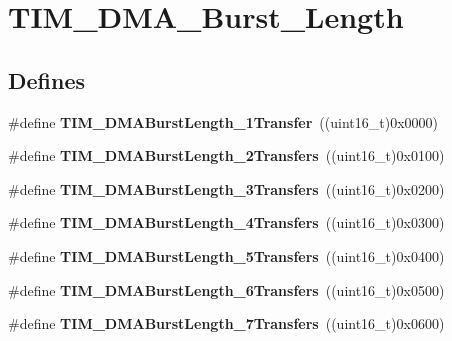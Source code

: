 \hypertarget{group__TIM__DMA__Burst__Length}{
\section{TIM\_\-DMA\_\-Burst\_\-Length}
\label{group__TIM__DMA__Burst__Length}
}
\subsection*{Defines}
\begin{DoxyCompactItemize}
\item 
\hypertarget{group__TIM__DMA__Burst__Length_gab87f91f1c5583b9888cb6bb37fc639e2}{
\#define {\bfseries TIM\_\-DMABurstLength\_\-1Transfer}~((uint16\_\-t)0x0000)}
\label{group__TIM__DMA__Burst__Length_gab87f91f1c5583b9888cb6bb37fc639e2}

\item 
\hypertarget{group__TIM__DMA__Burst__Length_ga829504c3e8c90a9445f6a223bc3034f8}{
\#define {\bfseries TIM\_\-DMABurstLength\_\-2Transfers}~((uint16\_\-t)0x0100)}
\label{group__TIM__DMA__Burst__Length_ga829504c3e8c90a9445f6a223bc3034f8}

\item 
\hypertarget{group__TIM__DMA__Burst__Length_ga3a99863a0925e0cc9a11b91aade66f11}{
\#define {\bfseries TIM\_\-DMABurstLength\_\-3Transfers}~((uint16\_\-t)0x0200)}
\label{group__TIM__DMA__Burst__Length_ga3a99863a0925e0cc9a11b91aade66f11}

\item 
\hypertarget{group__TIM__DMA__Burst__Length_ga84bfeb309593a1ac580e233bf7514b36}{
\#define {\bfseries TIM\_\-DMABurstLength\_\-4Transfers}~((uint16\_\-t)0x0300)}
\label{group__TIM__DMA__Burst__Length_ga84bfeb309593a1ac580e233bf7514b36}

\item 
\hypertarget{group__TIM__DMA__Burst__Length_ga44f8aa51fbe8887a5f3c37a0e776902c}{
\#define {\bfseries TIM\_\-DMABurstLength\_\-5Transfers}~((uint16\_\-t)0x0400)}
\label{group__TIM__DMA__Burst__Length_ga44f8aa51fbe8887a5f3c37a0e776902c}

\item 
\hypertarget{group__TIM__DMA__Burst__Length_ga8be40a21654eea72e9c1bf9922675b22}{
\#define {\bfseries TIM\_\-DMABurstLength\_\-6Transfers}~((uint16\_\-t)0x0500)}
\label{group__TIM__DMA__Burst__Length_ga8be40a21654eea72e9c1bf9922675b22}

\item 
\hypertarget{group__TIM__DMA__Burst__Length_gaf2ae83bd73b0e92b73e5ebfc11f9bfad}{
\#define {\bfseries TIM\_\-DMABurstLength\_\-7Transfers}~((uint16\_\-t)0x0600)}
\label{group__TIM__DMA__Burst__Length_gaf2ae83bd73b0e92b73e5ebfc11f9bfad}


\end{DoxyCompactItemize}
